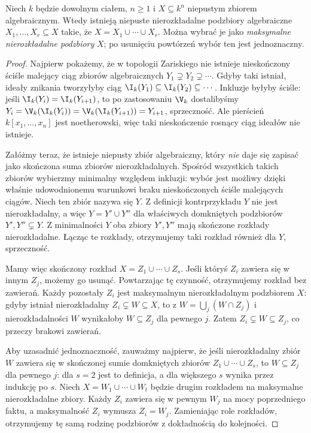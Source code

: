 \begin{twierdzenie}
\label{tw:finite-components}
Niech $k$ będzie dowolnym ciałem, $n\ge1$ i
$X\subseteq k^n$ niepustym zbiorem algebraicznym.
Wtedy istnieją niepuste nierozkładalne podzbiory
algebraiczne $X_1,\dots,X_r\subseteq X$ takie, że
$X=X_1\cup\cdots\cup X_r$.
Można wybrać je jako \emph{maksymalne nierozkładalne podzbiory}
$X$; po usunięciu powtórzeń wybór ten jest jednoznaczny.
\end{twierdzenie}
\begin{proof}
Najpierw pokażemy, że w topologii Zariskiego nie istnieje
nieskończony ściśle malejący ciąg zbiorów algebraicznych
$Y_1\supsetneq Y_2\supsetneq\cdots$.
Gdyby taki istniał, ideały znikania tworzyłyby ciąg
$\I_k(Y_1)\subseteq\I_k(Y_2)\subseteq\cdots$.
Inkluzje byłyby ściśle: jeśli $\I_k(Y_i)=\I_k(Y_{i+1})$,
to po zastosowaniu $\V_k$ dostalibyśmy
$Y_i=\V_k(\I_k(Y_i))=\V_k(\I_k(Y_{i+1}))=Y_{i+1}$,
sprzeczność. Ale pierścień $k[x_1,\dots,x_n]$ jest noetherowski,
więc taki nieskończenie rosnący ciąg ideałów nie istnieje.

Załóżmy teraz, że istnieje niepusty zbiór algebraiczny,
który \emph{nie} daje się zapisać jako skończona suma zbiorów
nierozkładalnych. Spośród wszystkich takich zbiorów wybierzmy
minimalny względem inkluzji: wybór jest możliwy dzięki
właśnie udowodnionemu warunkowi braku nieskończonych ściśle
malejących ciągów. Niech ten zbiór nazywa się $Y$.
Z definicji kontrprzykładu $Y$ nie jest nierozkładalny,
a więc $Y=Y'\cup Y''$ dla właściwych domkniętych
podzbiorów $Y',Y''\subsetneq Y$.
Z minimalności $Y$ oba zbiory $Y',Y''$ mają skończone
rozkłady nierozkładalne. Łącząc te rozkłady, otrzymujemy
taki rozkład również dla $Y$, sprzeczność.

Mamy więc skończony rozkład $X=Z_1\cup\cdots\cup Z_s$.
Jeśli któryś $Z_i$ zawiera się w innym $Z_j$, możemy go usunąć.
Powtarzając tę czynność, otrzymujemy rozkład bez zawierań.
Każdy pozostały $Z_i$ jest maksymalnym nierozkładalnym
podzbiorem $X$: gdyby istniał nierozkładalny
$Z_i\subsetneq W\subseteq X$, to z
$W=\bigcup_j(W\cap Z_j)$ i nierozkładalności $W$
wynikałoby $W\subseteq Z_j$ dla pewnego $j$.
Zatem $Z_i\subsetneq W\subseteq Z_j$, co przeczy brakowi zawierań.

Aby uzasadnić jednoznaczność, zauważmy najpierw, że jeśli
nierozkładalny zbiór $W$ zawiera się w skończonej sumie
domkniętych zbiorów $Z_1\cup\cdots\cup Z_s$,
to $W\subseteq Z_j$ dla pewnego $j$: dla $s=2$ jest to definicja,
a dla większego $s$ wynika przez indukcję po $s$.
Niech $X=W_1\cup\cdots\cup W_t$ będzie drugim rozkładem
na maksymalne nierozkładalne zbiory. Każdy $Z_i$ zawiera się
w pewnym $W_j$ na mocy poprzedniego faktu, a maksymalność
$Z_i$ wymusza $Z_i=W_j$. Zamieniając role rozkładów,
otrzymujemy tę samą rodzinę podzbiorów z dokładnością
do kolejności.
\end{proof}

